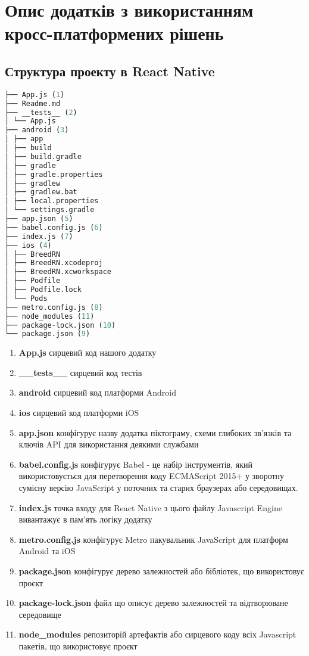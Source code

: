 \chapter{Опис додатків з використанням кросс-платформених рішень}
\label{ch2}


\section{Структура проекту в React Native}
\label{sec:rn_structure_app}

\begin{lstlisting}[style=light, language=Python,label={lst:rn_app_structure},caption=React Native App Layout]
├── App.js (1)
├── Readme.md
├── __tests__ (2)
│ └── App.js
├── android (3)
│ ├── app
│ ├── build
│ ├── build.gradle
│ ├── gradle
│ ├── gradle.properties
│ ├── gradlew
│ ├── gradlew.bat
│ ├── local.properties
│ └── settings.gradle
├── app.json (5)
├── babel.config.js (6)
├── index.js (7)
├── ios (4)
│ ├── BreedRN
│ ├── BreedRN.xcodeproj
│ ├── BreedRN.xcworkspace
│ ├── Podfile
│ ├── Podfile.lock
│ └── Pods
├── metro.config.js (8)
├── node_modules (11)
├── package-lock.json (10)
└── package.json (9)
\end{lstlisting}

\begin{enumerate}
    \item \textbf{App.js} сирцевий код нашого додатку
    \item \textbf{\_\_tests\_\_} сирцевий код тестів
    \item \textbf{android} сирцевий код платформи Android
    \item \textbf{ios} сирцевий код платформи iOS
    \item \textbf{app.json} конфігурує назву додатка піктограму, схеми глибоких зв’язків та ключів API для використання деякими службами
    \item \textbf{babel.config.js} конфігурує Babel - це набір інструментів, який використовується для перетворення коду ECMAScript 2015+ у зворотну сумісну версію JavaScript у поточних та старих браузерах або середовищах.
    \item \textbf{index.js} точка входу для React Native з цього файлу Javascript Engine вивантажує в пам'ять логіку додатку
    \item \textbf{metro.config.js} конфігурує Metro пакувальник JavaScript для платформ Android та iOS
    \item \textbf{package.json} конфігурує дерево залежностей або бібліотек, що використовує проєкт
    \item \textbf{package-lock.json} файл що описує дерево залежностей та відтворюване середовище
    \item \textbf{node\_modules} репозиторій артефактів або сирцевого коду всіх Javascript пакетів, що використовує проєкт
\end{enumerate}


